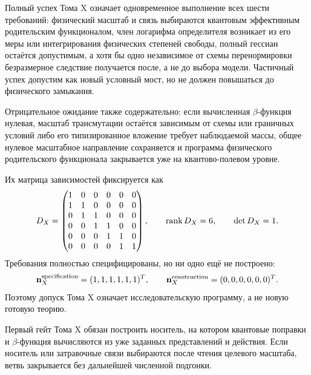 Полный успех Тома X означает одновременное выполнение всех шести требований:
физический масштаб и связь выбираются квантовым эффективным родительским
функционалом, член логарифма определителя
возникает из его меры или интегрирования физических степеней свободы, полный
гессиан остаётся допустимым, а хотя бы одно независимое от схемы перенормировки безразмерное
следствие получается после, а не до выбора модели. Частичный успех допустим
как новый условный мост, но не должен повышаться до физического замыкания.

Отрицательное ожидание также содержательно: если вычисленная $\beta$-функция
нулевая, масштаб трансмутации остаётся зависимым от схемы или граничных
условий либо его типизированное вложение требует наблюдаемой массы, общее
нулевое масштабное направление сохраняется и программа физического
родительского функционала закрывается уже на квантово-полевом уровне.

Их матрица зависимостей фиксируется как
\begin{equation}
 D_X=
 \begin{pmatrix}
 1&0&0&0&0&0\\
 1&1&0&0&0&0\\
 0&1&1&0&0&0\\
 0&0&1&1&0&0\\
 0&0&0&1&1&0\\
 0&0&0&0&1&1
 \end{pmatrix},
 \qquad \operatorname{rank} D_X=6,
 \qquad \det D_X=1.
 \label{eq:v9-final-tome10-dependency}
\end{equation}
Требования полностью специфицированы, но ни одно ещё не построено:
\begin{equation}
 \mathbf n_X^{\rm specification}=(1,1,1,1,1,1)^T,
 \qquad
 \mathbf n_X^{\rm construction}=(0,0,0,0,0,0)^T.
 \label{eq:v9-final-tome10-status}
\end{equation}
Поэтому допуск Тома X означает исследовательскую программу, а не новую готовую
теорию.

\begin{nogocriterion}
Первый гейт Тома X обязан построить носитель, на котором квантовые поправки
и $\beta$-функция вычисляются из уже заданных представлений и действия.
Если носитель или затравочные связи выбираются после чтения целевого
масштаба, ветвь закрывается без дальнейшей численной подгонки.
\end{nogocriterion}

